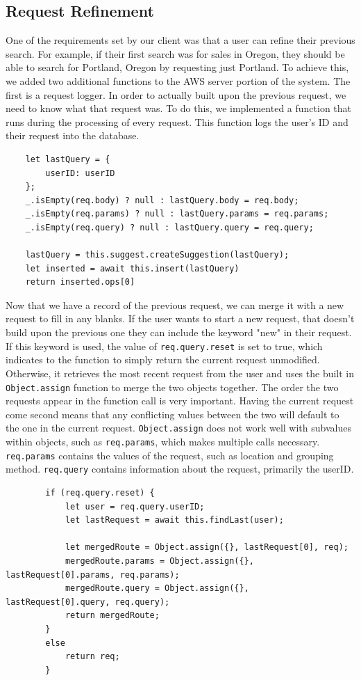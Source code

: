 \documentclass[onecolumn, draftclsnofoot,10pt, compsoc]{IEEEtran}
\begin{document}
    \subsection{Request Refinement}
    One of the requirements set by our client was that a user can refine their previous search. For example, if their first search was for sales in Oregon, they should be able to search for Portland, Oregon by requesting just Portland. To achieve this, we added two additional functions to the AWS server portion of the system. The first is a request logger. In order to actually built upon the previous request, we need to know what that request was. To do this, we implemented a function that runs during the processing of every request. This function logs the user's ID and their request into the database.
    \begin{lstlisting}
    let lastQuery = {
        userID: userID
    };
    _.isEmpty(req.body) ? null : lastQuery.body = req.body;
    _.isEmpty(req.params) ? null : lastQuery.params = req.params;
    _.isEmpty(req.query) ? null : lastQuery.query = req.query;
        
    lastQuery = this.suggest.createSuggestion(lastQuery);
    let inserted = await this.insert(lastQuery)
    return inserted.ops[0]
    \end{lstlisting}
    
    Now that we have a record of the previous request, we can merge it with a new request to fill in any blanks. If the user wants to start a new request, that doesn't build upon the previous one they can include the keyword "new" in their request. If this keyword is used, the value of \texttt{req.query.reset} is set to true, which indicates to the function to simply return the current request unmodified. Otherwise, it retrieves the most recent request from the user and uses the built in \texttt{Object.assign} function to merge the two objects together. The order the two requests appear in the function call is very important. Having the current request come second means that any conflicting values between the two will default to the one in the current request. \texttt{Object.assign} does not work well with subvalues within objects, such as \texttt{req.params}, which makes multiple calls necessary. \texttt{req.params} contains the values of the request, such as location and grouping method. \texttt{req.query} contains information about the request, primarily the userID. 
    \begin{lstlisting}
        if (req.query.reset) {
            let user = req.query.userID;
            let lastRequest = await this.findLast(user);
        
            let mergedRoute = Object.assign({}, lastRequest[0], req);
            mergedRoute.params = Object.assign({}, lastRequest[0].params, req.params);
            mergedRoute.query = Object.assign({}, lastRequest[0].query, req.query);
            return mergedRoute;
        }
        else
            return req;
        }
    \end{lstlisting}
    
\end{document}
